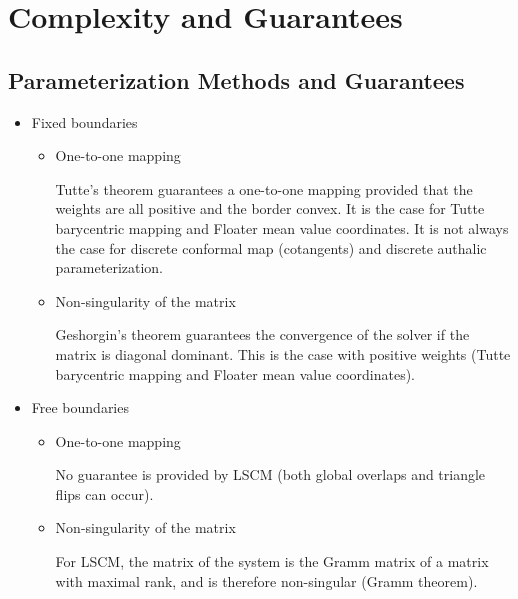 \section{Complexity and Guarantees}


\subsection{Parameterization Methods and Guarantees}

\begin{itemize}

\item Fixed boundaries

    \begin{itemize}

    \item One-to-one mapping

        Tutte's theorem guarantees a one-to-one mapping provided that the weights are all positive
        and the border convex.
        It is the case for Tutte barycentric mapping and Floater mean value coordinates.
        It is not always the case for discrete conformal map (cotangents) and
        discrete authalic parameterization.

    \item Non-singularity of the matrix

        Geshorgin's theorem guarantees the convergence of the solver if the matrix is diagonal dominant.
        This is the case with positive weights (Tutte barycentric mapping and Floater mean value coordinates).

    \end{itemize}

\item Free boundaries

    \begin{itemize}

    \item One-to-one mapping

        No guarantee is provided by LSCM (both global overlaps and triangle flips can
        occur).

    \item Non-singularity of the matrix

        For LSCM, the matrix of the system is the Gramm matrix of a matrix with maximal rank,
        and is therefore non-singular (Gramm theorem).

    \end{itemize}

\end{itemize}


